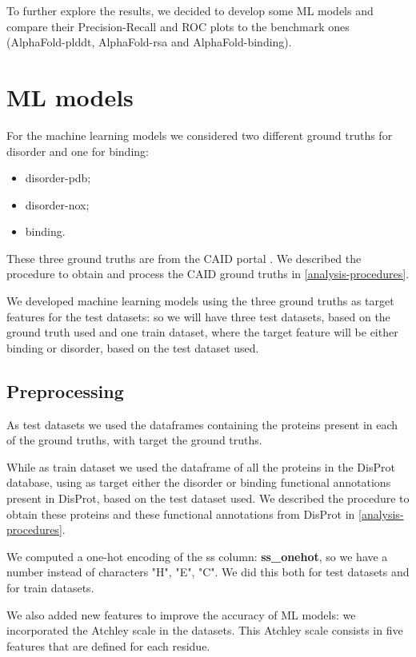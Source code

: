 To further explore the results, we decided to develop some ML models and compare their Precision-Recall and ROC plots to the benchmark ones (AlphaFold-plddt, AlphaFold-rsa and AlphaFold-binding).

\section{ML models}
For the machine learning models we considered two different ground truths for disorder and one for binding:
\begin{itemize}
    \item disorder-pdb;
    \item disorder-nox;
    \item binding.
\end{itemize}
These three ground truths are from the CAID portal \cite{caid}. We described the procedure to obtain and process the CAID ground truths in \ref{analysis-procedures}.

We developed machine learning models using the three ground truths as target features for the test datasets: so we will have three test datasets, based on the ground truth used and one train dataset, where the target feature will be either binding or disorder, based on the test dataset used.

\subsection{Preprocessing}
As test datasets we used the dataframes containing the proteins present in each of the ground truths, with target the ground truths.

While as train dataset we used the dataframe of all the proteins in the DisProt database, using as target either the disorder or binding functional annotations present in DisProt, based on the test dataset used. We described the procedure to obtain these proteins and these functional annotations from DisProt in \ref{analysis-procedures}.

We computed a one-hot encoding of the ss column: \textbf{ss\_onehot}, so we have a number instead of characters "H", "E", "C". We did this both for test datasets and for train datasets. 

We also added new features to improve the accuracy of ML models: we incorporated the Atchley scale in the datasets. This Atchley scale consists in five features that are defined for each residue.

